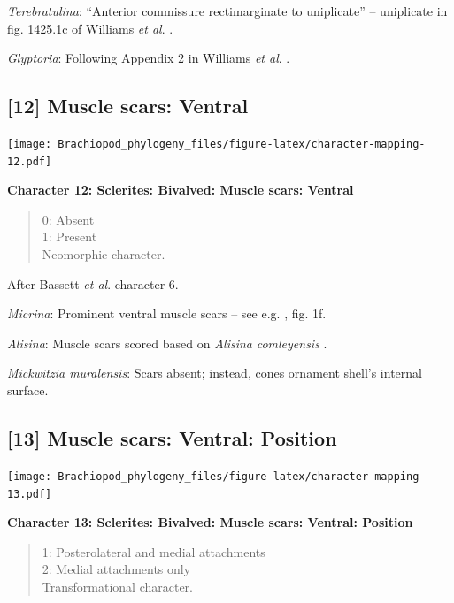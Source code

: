 \documentclass[]{book}
\theoremstyle{definition}
\theoremstyle{definition}
\theoremstyle{definition}
\theoremstyle{remark}
\begin{document}
\emph{Terebratulina}: ``Anterior commissure rectimarginate to
uniplicate'' -- uniplicate in fig. 1425.1c of Williams \emph{et al}.
\citeyearpar{Williams2006Rhynchonelliformeapart}.

\emph{Glyptoria}: Following Appendix 2 in Williams \emph{et al}.
\citeyearpar{Williams1998Thediversity}.

\hypertarget{muscle-scars-ventral}{%
\subsection*{{[}12{]} Muscle scars:
Ventral}\label{muscle-scars-ventral}}

\texttt{[image: Brachiopod\_phylogeny\_files/figure-latex/character-mapping-12.pdf]}

\textbf{Character 12: Sclerites: Bivalved: Muscle scars: Ventral }

\begin{quote}
0: Absent\\
1: Present\\
Neomorphic character.
\end{quote}

After Bassett \emph{et al}.
\citeyearpar{Bassett2001Functionalmorphology} character 6.

\emph{Micrina}: Prominent ventral muscle scars -- see e.g.
\citet{Holmer2008TheEarly}, fig. 1f.

\emph{Alisina}: Muscle scars scored based on \emph{Alisina}
\emph{comleyensis} \citep{Bassett2001Functionalmorphology}.

\emph{Mickwitzia muralensis}: Scars absent; instead, cones ornament
shell's internal surface.

\hypertarget{muscle-scars-ventral-position}{%
\subsection*{{[}13{]} Muscle scars: Ventral:
Position}\label{muscle-scars-ventral-position}}

\texttt{[image: Brachiopod\_phylogeny\_files/figure-latex/character-mapping-13.pdf]}

\textbf{Character 13: Sclerites: Bivalved: Muscle scars: Ventral:
Position}

\begin{quote}
1: Posterolateral and medial attachments\\
2: Medial attachments only\\
Transformational character.
\end{quote}
\end{document}
